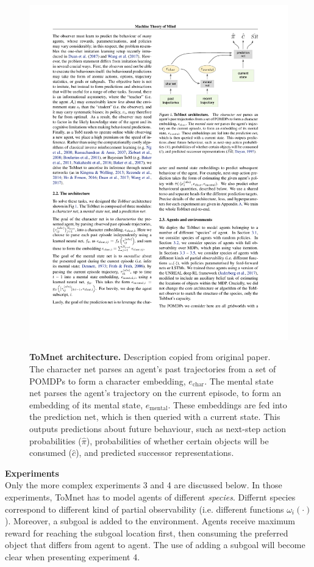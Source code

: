 \documentclass[twocolumn,superscriptaddress,aps]{revtex4-1}
\begin{document}
\begin{figure}[!htb]
\includegraphics[width=\linewidth, height=\textheight, keepaspectratio]{figs/model}
\label{fig:model}
\caption{\textbf{ToMnet architecture.} Description copied from original paper. The character net parses an agent’s past trajectories from a set of POMDPs to form a character
embedding, $e_{\text{char}}$. The mental state net parses the agent’s trajectory on the current episode, to form an embedding of its mental state, $e_{\text{mental}}$. These embeddings are fed into the prediction net, which is then queried with a current state. This outputs predictions about future behaviour, such as next-step action probabilities ($\hat{\pi}$), probabilities of whether certain objects will be consumed ($\hat{c}$), and predicted successor representations.}
\end{figure}

\noindent \textbf{Experiments} \\[0.15cm]
Only the more complex experiments 3 and 4 are discussed below. In those experiments, ToMnet has to model agents of different \textit{species}. Differnt species correspond to different kind of partial observability (i.e. different functions $\omega_i(\cdot)$). Moreover, a subgoal is added to the environment. Agents receive maximum reward for reaching the subgoal location first, then consuming the preferred object that differs from agent to agent. The use of adding a subgoal will become clear when presenting experiment 4.\\
\end{document}
